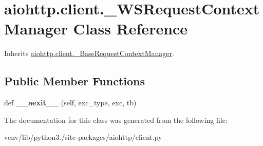 \hypertarget{classaiohttp_1_1client_1_1___w_s_request_context_manager}{}\section{aiohttp.\+client.\+\_\+\+W\+S\+Request\+Context\+Manager Class Reference}
\label{classaiohttp_1_1client_1_1___w_s_request_context_manager}


Inherits \hyperlink{classaiohttp_1_1client_1_1___base_request_context_manager}{aiohttp.\+client.\+\_\+\+Base\+Request\+Context\+Manager}.

\subsection*{Public Member Functions}
\begin{DoxyCompactItemize}
\item 
\mbox{\label{classaiohttp_1_1client_1_1___w_s_request_context_manager_ae85d6dd06cd141f86dc7ecf8894fb815}} 
def {\bfseries \+\_\+\+\_\+aexit\+\_\+\+\_\+} (self, exc\+\_\+type, exc, tb)
\end{DoxyCompactItemize}


The documentation for this class was generated from the following file\+:\begin{DoxyCompactItemize}
\item 
venv/lib/python3./site-\/packages/aiohttp/client.\+py\end{DoxyCompactItemize}
